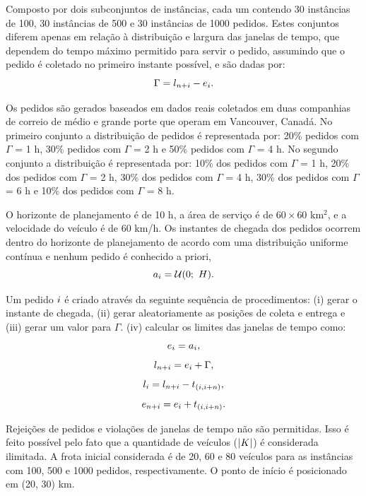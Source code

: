 Composto por dois subconjuntos de instâncias, cada um contendo 30 instâncias de 
100, 30 instâncias de 500 e 30 instâncias de 1000 pedidos.
Estes conjuntos diferem apenas em relação à distribuição e largura das 
janelas de tempo, que dependem do tempo máximo permitido para servir o pedido, 
assumindo que o pedido é coletado no primeiro instante possível, e são dadas 
por:
%
\begin{equation}
    \Gamma = l_{n + i}
              - e_i.
    \label{eq: mitrovic_maximal_time_allowed}
\end{equation}


Os pedidos são gerados baseados em dados reais coletados em duas companhias de 
correio de médio e grande porte que operam em Vancouver, Canadá.
No primeiro conjunto a distribuição de pedidos é representada por: 
20\% pedidos com $\Gamma$ = 1 h, 30\% pedidos com $\Gamma$ = 2 h e 
50\% pedidos com $\Gamma$ = 4 h.
No segundo conjunto a distribuição é representada por: 10\% dos pedidos com 
$\Gamma$ = 1 h, 20\% dos pedidos com $\Gamma$ = 2 h, 30\% dos pedidos com 
$\Gamma$ = 4 h, 30\% dos pedidos com $\Gamma$ = 6 h 
e 10\% dos pedidos com $\Gamma$ = 8 h.

O horizonte de planejamento é de 10 h, a área de serviço é de $60 \times 60$ 
km$^2$, e a velocidade do veículo é de 60 km/h. 
Os instantes de chegada dos pedidos ocorrem dentro do horizonte de planejamento
de acordo com uma distribuição uniforme contínua e nenhum pedido é conhecido 
a priori,
%
\begin{equation}
  a_i = \mathcal{U}(0;\ H).
\end{equation}


Um pedido $i$ é criado através da seguinte sequência de procedimentos: 
(i) gerar o instante de chegada, 
(ii) gerar aleatoriamente as posições de coleta e entrega e 
(iii) gerar um valor para $\Gamma$.
(iv) calcular os limites das janelas de tempo como:
%
\begin{equation}
  e_i = a_i,
\end{equation}
%
\begin{equation}
  l_{n + i} = e_i +
  \Gamma,
\end{equation}
%
\begin{equation}
  l_i = l_{n + i}
  - t_{(i,i+n)},
\end{equation}
%
\begin{equation}
  e_{n + i} = e_i
  + t_{(i,i+n)}.
\end{equation}

Rejeições de pedidos e violações de janelas de tempo não são permitidas. 
Isso é feito possível pelo fato que a quantidade de veículos 
($|K|$) é considerada ilimitada. 
A frota inicial considerada é de 20, 60 e 80 veículos para as instâncias com 
100, 500 e 1000 pedidos, respectivamente. 
O ponto de início é posicionado em (20, 30) km.





